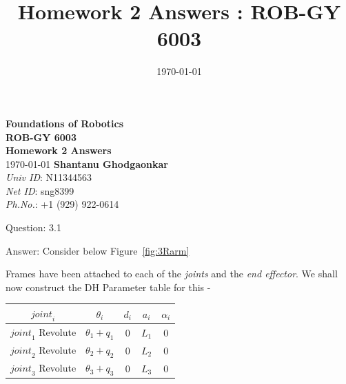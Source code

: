 \documentclass[a4paper]{article}
\title{Homework 2 Answers : ROB-GY 6003}
\author{\myName}
\date{\today}
\newcommand{\myName}{\textbf{Shantanu Ghodgaonkar}\\\textit{Univ ID}: N11344563\\\textit{Net ID}: sng8399\\\textit{Ph.No.}: +1 (929) 922-0614}
\begin{document}
	
	\begin{titlepage}
	    \centering
	    \vspace{2cm}
	    \Huge\textbf{Foundations of Robotics \\ ROB-GY 6003 \\ Homework 2 Answers}
	    \vspace{1cm}
	    \\ \Large \today
	    \vfill 
	    \Large \myName
	\end{titlepage}
	
	\begin{qalist}			
		\item[Question: 3.1] \setcounter{equation}{0} %
		\item[Answer:] Consider below Figure~\ref{fig:3Rarm} \\
			\begin{minipage}{\linewidth}
				\vspace{0.5cm}
				\centering
				\label{fig:3Rarm}
				\vspace{0.5cm}
			\end{minipage}
			Frames have been attached to each of the \textit{joints} and the \textit{end effector}. 
			We shall now construct the DH Parameter table for this - \\
			\begin{minipage}{\linewidth}
				\vspace{0.5cm}
				\centering
				\begin{tabular}{|c|c|c|c|c|}
					\hline
					${joint}_{i}$ & ${\theta}_{i}$ & ${d}_{i}$ & ${a}_{i}$ & ${\alpha}_{i}$\\
					\hline \hline
					${joint}_{1}$ Revolute & ${\theta}_{1} + {q}_{1}$ & $0$ & ${L}_{1}$ & $0 $\\
					\hline
					${joint}_{2}$ Revolute & ${\theta}_{2} + {q}_{2}$ & $0$ & ${L}_{2}$ & $0$\\
					\hline
					${joint}_{3}$ Revolute& ${\theta}_{3} + {q}_{3}$ & $0$ & ${L}_{3}$ & $0 $\\
					\hline
				\end{tabular}
				\vspace{0.5cm}
			\end{minipage}	
			

\end{qalist}
\end{document}
